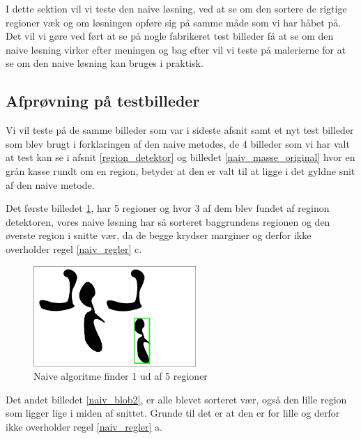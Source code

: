 {\sffamily
I dette sektion vil vi teste den naive løsning, ved at se om den sortere
de rigtige regioner væk og om løsningen opføre sig på samme måde som vi
har håbet på. Det vil vi gøre ved ført at se på nogle fabrikeret test
billeder få at se om den naive løsning virker efter meningen og bag
efter vil vi teste på malerierne for at se om den naive løsning kan
bruges i praktisk.
}
  
\subsection{Afprøvning på testbilleder}
Vi vil teste på de samme billeder som var i sideste afsnit samt et nyt
test billeder som blev brugt i forklaringen af den naive metodes, de 4
billeder som vi har valt at test kan se i afsnit \ref{region_detektor} og billedet 
\ref{naiv_masse_original} hvor en grån kasse rundt om en region, betyder
at den er valt til at ligge i det gyldne snit af den naive metode. 

Det første billedet \ref{naiv_blob1}, har 5
regioner og hvor 3 af dem blev fundet af reginon detektoren, vores naive
løsning har så sorteret baggrundens regionen og den øverste region i
snitte vær, da de begge krydser marginer og derfor ikke overholder regel
\ref{naiv_regler} c. 

\begin{figure}[!h]
	\begin{center}
        \includegraphics[angle=0,width=0.55\textwidth]{afsnit/afprovning/billeder/naive_losning/naiv_blob1.png}
	\end{center}       
	\caption{Naive algoritme finder 1 ud af 5 regioner}	
	\label{naiv_blob1}
\end{figure}

Det andet billedet \ref{naiv_blob2}, er alle blevet
sorteret vær, også den lille region som ligger lige i miden af snittet.
Grunde til det er at den er for lille og derfor ikke overholder regel
\ref{naiv_regler} a. 

